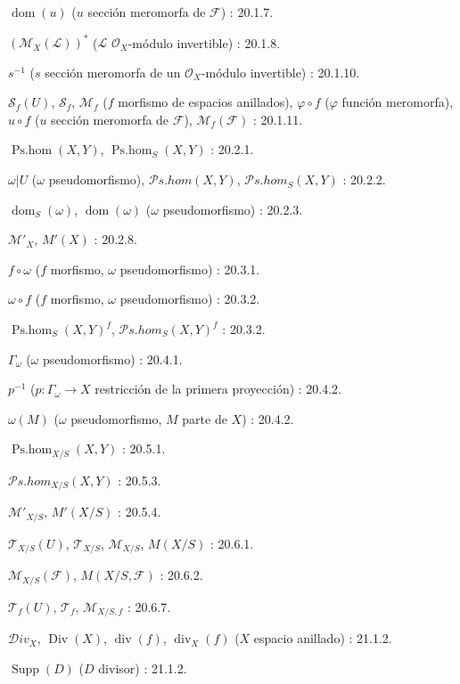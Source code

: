 $\operatorname{dom}(u)$ ($u$ sección meromorfa de $\mathcal F$) : 20.1.7.

$(\mathcal M_X(\mathcal L))^{*}$
($\mathcal L$ $\mathcal O_X$-módulo invertible) : 20.1.8.

$s^{-1}$ ($s$ sección meromorfa de un $\mathcal O_X$-módulo invertible) : 20.1.10.

$\mathcal S_f(U)$, $\mathcal S_f$, $\mathcal M_f$
($f$ morfismo de espacios anillados), $\varphi\circ f$ ($\varphi$ función meromorfa),
$u\circ f$ ($u$ sección meromorfa de $\mathcal F$), $\mathcal M_f(\mathcal F)$ : 20.1.11.

$\operatorname{Ps.hom}(X,Y)$, $\operatorname{Ps.hom}_S(X,Y)$ : 20.2.1.

$\omega|U$ ($\omega$ pseudomorfismo),
$\mathcal P\!s.\mathit{hom}(X,Y)$,
$\mathcal P\!s.\mathit{hom}_S(X,Y)$ : 20.2.2.

$\operatorname{dom}_S(\omega)$, $\operatorname{dom}(\omega)$
($\omega$ pseudomorfismo) : 20.2.3.

$\mathcal M'_X$, $M'(X)$ : 20.2.8.

$f\circ\omega$ ($f$ morfismo, $\omega$ pseudomorfismo) : 20.3.1.

$\omega\circ f$ ($f$ morfismo, $\omega$ pseudomorfismo) : 20.3.2.

$\operatorname{Ps.hom}_S(X,Y)^f$,
$\mathcal P\!s.\mathit{hom}_S(X,Y)^f$ : 20.3.2.

$\Gamma_\omega$ ($\omega$ pseudomorfismo) : 20.4.1.

$p^{-1}$ ($p:\Gamma_\omega\to X$ restricción de la primera proyección) : 20.4.2.

$\omega(M)$ ($\omega$ pseudomorfismo, $M$ parte de $X$) : 20.4.2.

$\operatorname{Ps.hom}_{X/S}(X,Y)$ : 20.5.1.

$\mathcal P\!s.\mathit{hom}_{X/S}(X,Y)$ : 20.5.3.

$\mathcal M'_{X/S}$, $M'(X/S)$ : 20.5.4.

$\mathcal T_{X/S}(U)$, $\mathcal T_{X/S}$, $\mathcal M_{X/S}$,
$M(X/S)$ : 20.6.1.

$\mathcal M_{X/S}(\mathcal F)$, $M(X/S,\mathcal F)$ : 20.6.2.

$\mathcal T_f(U)$, $\mathcal T_f$, $\mathcal M_{X/S,f}$ : 20.6.7.

$\mathcal{D}iv_X$, $\operatorname{Div}(X)$, $\operatorname{div}(f)$,
$\operatorname{div}_X(f)$ ($X$ espacio anillado) : 21.1.2.

$\operatorname{Supp}(D)$ ($D$ divisor) : 21.1.2.

